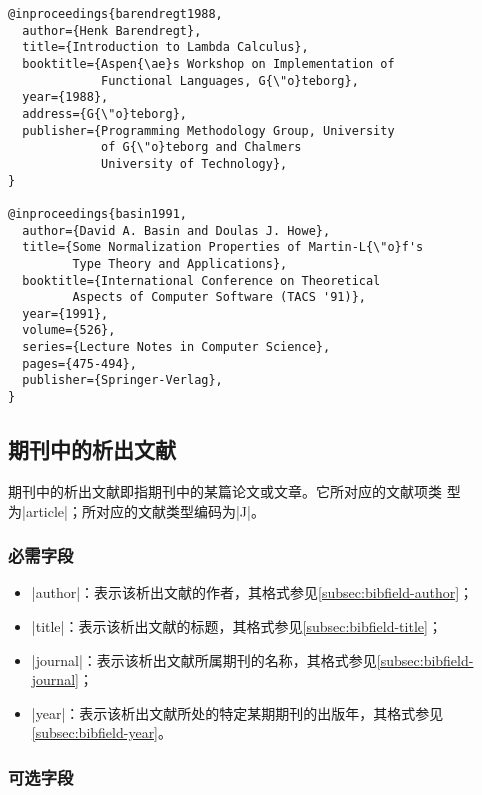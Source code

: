 \begin{verbatim}
@inproceedings{barendregt1988,
  author={Henk Barendregt},
  title={Introduction to Lambda Calculus},
  booktitle={Aspen{\ae}s Workshop on Implementation of 
             Functional Languages, G{\"o}teborg},
  year={1988},
  address={G{\"o}teborg},
  publisher={Programming Methodology Group, University 
             of G{\"o}teborg and Chalmers
             University of Technology},
}

@inproceedings{basin1991,
  author={David A. Basin and Doulas J. Howe},
  title={Some Normalization Properties of Martin-L{\"o}f's 
         Type Theory and Applications},
  booktitle={International Conference on Theoretical 
         Aspects of Computer Software (TACS '91)},
  year={1991},
  volume={526},
  series={Lecture Notes in Computer Science},
  pages={475-494},
  publisher={Springer-Verlag},
}
\end{verbatim}

\subsection{期刊中的析出文献}\label{subsec:bibtype-article}

期刊中的析出文献即指期刊中的某篇论文或文章\cite{gbt7714-2005}。它所对应的{\BibTeX}文献项类
型为|article|；所对应的文献类型编码为|J|\cite{gbt3469-1983}。

\subsubsection{必需字段}

\begin{itemize}
\item |author|：表示该析出文献的作者，其格式参见\ref{subsec:bibfield-author}；
\item |title|：表示该析出文献的标题，其格式参见\ref{subsec:bibfield-title}；
\item |journal|：表示该析出文献所属期刊的名称，其格式参见\ref{subsec:bibfield-journal}；
\item |year|：表示该析出文献所处的特定某期期刊的出版年，其格式参见\ref{subsec:bibfield-year}。
\end{itemize}

\subsubsection{可选字段}

